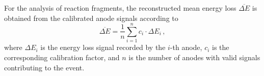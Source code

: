 For the analysis of reaction fragments, the reconstructed mean energy loss \(\overline{\Delta E}\) is obtained from the calibrated anode signals according to
\begin{equation}
\overline{\Delta E} = \frac{1}{n} \sum_{i=1}^{n} c_i \cdot \Delta E_i \, ,
\end{equation}
where \(\Delta E_i\) is the energy loss signal recorded by the \(i\)-th anode, \(c_i\) is the corresponding calibration factor, and $n$ is the number of anodes with valid signals contributing to the event.
